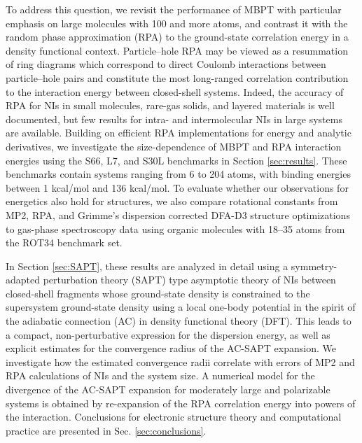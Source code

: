 \documentclass[journal=jctcce,manuscript=article]{achemso}
\begin{document}
To address this question, we revisit the performance of MBPT with 
particular emphasis on large molecules with 100 and more atoms, and
contrast it with the random phase approximation (RPA) to the
ground-state correlation 
energy in a density functional context\cite{Langreth75SolidStateCommun17p1425,
Langreth77PhysRevB15p2884,PhysRevB.59.4708}.
Particle--hole RPA may be viewed as a resummation of ring diagrams\cite{PhysRev.106.364}
which correspond to direct Coulomb interactions between particle--hole pairs
and constitute the most long-ranged correlation contribution to the
interaction energy between closed-shell
systems\cite{Dobson05IntJQuantumChem101p579, 
  Dobson12JPhysCondensMatter24p073201}.
Indeed, the accuracy of RPA for NIs in small molecules,\cite{Eshuis11JPhysChemLett2p983,
  doi:10.1063/1.3494541} 
rare-gas solids,\cite{Harl09PhysRevLett103p056401} and layered
materials\cite{Lebegue10PhysRevLett105p196401} 
is well documented, but few results for intra- and intermolecular NIs
in large systems are available.\cite{heelmann201765,doi:10.1063/1.5025938} Building on efficient
RPA implementations for energy\cite{Eshuis10JChemPhys132p234114} and analytic 
derivatives\cite{Burow14JChemTheoryComput10p180}, we investigate the
size-dependence of MBPT and RPA interaction energies using the 
S66,\cite{doi:10.1021/ct2002946,doi:10.1021/ct200523a}
L7,\cite{doi:10.1021/ct400036b} and S30L\cite{Sure15JChemTheoryComput}
benchmarks in Section \ref{sec:results}.
These benchmarks contain systems ranging from 6 to 204 atoms, with
binding energies between 1 kcal/mol and 136 kcal/mol. To evaluate whether our
observations for energetics also hold for structures, we also compare
rotational constants  
from MP2, RPA, and Grimme's dispersion corrected DFA-D3\cite{Grimme12ChemEurJ18p9955}
structure optimizations  to gas-phase spectroscopy data using organic
molecules with 18--35 atoms from the ROT34 benchmark
set\cite{C3CP52293H,Risthaus14JComputChem35p1509}.

In Section \ref{sec:SAPT}, these results are analyzed in detail using a
symmetry-adapted perturbation theory (SAPT) type\cite{doi:10.1080/00268977900101601,
  doi:10.1063/1.461528} 
asymptotic theory of NIs between closed-shell fragments whose
ground-state density is constrained to the supersystem ground-state
density using a local one-body potential in the spirit of the adiabatic
connection (AC)\cite{Langreth77PhysRevB15p2884,Langreth75SolidStateCommun17p1425,  
  PhysRevB.13.4274,PhysRevB.15.6006.3} in density functional
theory (DFT). This leads to a compact, non-perturbative expression for
the dispersion energy, as well as explicit estimates for the convergence
radius of the AC-SAPT expansion. We investigate how the estimated
convergence radii correlate with errors of MP2 and RPA calculations of
NIs and the system size. A numerical model for the divergence of the
AC-SAPT expansion for moderately large and polarizable
systems is obtained by re-expansion of the RPA correlation
energy into powers of the interaction. Conclusions for electronic
structure theory and computational practice are
presented in Sec. \ref{sec:conclusions}.
\end{document}

